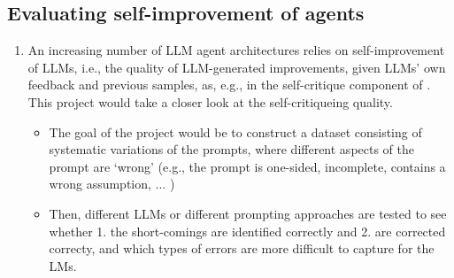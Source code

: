 \documentclass[fleqn,reqno,10pt]{article}
\begin{document}
\begin{enumerate}
\begin{itemize}
  \end{itemize}
\end{enumerate}

\subsection{Evaluating self-improvement of agents}
\begin{enumerate}
	\item An increasing number of LLM agent architectures relies on self-improvement of LLMs, i.e., the quality of LLM-generated improvements, given LLMs' own feedback and previous samples, as, e.g., in the self-critique component of \citet{bai2022constitutionalaiharmlessnessai}. This project would take a closer look at the self-critiqueing quality.
	\begin{itemize}
		\item The goal of the project would be to construct a dataset consisting of systematic variations of the prompts, where different aspects of the prompt are `wrong' (e.g., the prompt is one-sided, incomplete, contains a wrong assumption, ... )
		\item Then, different LLMs or different prompting approaches are tested to see whether 1. the short-comings are identified correctly and 2. are corrected correcty, and which types of errors are more difficult to capture for the LMs.
	\end{itemize}
\end{enumerate}


\end{document}
